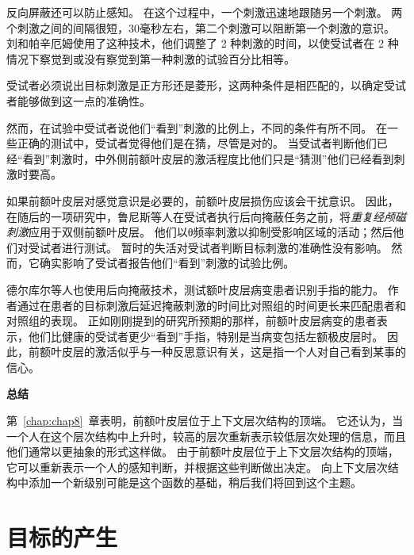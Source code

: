 反向屏蔽还可以防止感知。
在这个过程中，一个刺激迅速地跟随另一个刺激。
两个刺激之间的间隔很短，30毫秒左右，第二个刺激可以阻断第一个刺激的意识。
刘和帕辛厄姆\cite{lau2006relative}使用了这种技术，他们调整了 2 种刺激的时间，以使受试者在 2 种情况下察觉到或没有察觉到第一种刺激的试验百分比相等。
\par


受试者必须说出目标刺激是正方形还是菱形，这两种条件是相匹配的，以确定受试者能够做到这一点的准确性。
\par


然而，在试验中受试者说他们“看到”刺激的比例上，不同的条件有所不同。
在一些正确的测试中，受试者觉得他们是在猜，尽管是对的。
当受试者判断他们已经“看到”刺激时，中外侧前额叶皮层的激活程度比他们只是“猜测”他们已经看到刺激时要高。
\par


如果前额叶皮层对感觉意识是必要的，前额叶皮层损伤应该会干扰意识。
因此，在随后的一项研究中，鲁尼斯等人\cite{rounis2010theta}在受试者执行后向掩蔽任务之前，将\textit{重复经颅磁刺激}应用于双侧前额叶皮层。
他们以θ频率刺激以抑制受影响区域的活动；然后他们对受试者进行测试\cite{huang2005theta}。
暂时的失活对受试者判断目标刺激的准确性没有影响。
然而，它确实影响了受试者报告他们“看到”刺激的试验比例。
\par


德尔库尔等人\cite{del2009causal}也使用后向掩蔽技术，测试额叶皮层病变患者识别手指的能力。
作者通过在患者的目标刺激后延迟掩蔽刺激的时间比对照组的时间更长来匹配患者和对照组的表现。
正如刚刚提到的研究所预期的那样，前额叶皮层病变的患者表示，他们比健康的受试者更少“看到”手指，特别是当病变包括左额极皮层时。
因此，前额叶皮层的激活似乎与一种反思意识有关，这是指一个人对自己看到某事的信心。
\par


\textbf{总结}
\par

第~\ref{chap:chap8}~章表明，前额叶皮层位于上下文层次结构的顶端。
它还认为，当一个人在这个层次结构中上升时，较高的层次重新表示较低层次处理的信息，而且他们通常以更抽象的形式这样做。
由于前额叶皮层位于上下文层次结构的顶端，它可以重新表示一个人的感知判断，并根据这些判断做出决定。
向上下文层次结构中添加一个新级别可能是这个函数的基础，稍后我们将回到这个主题。



\section{目标的产生}
\par

